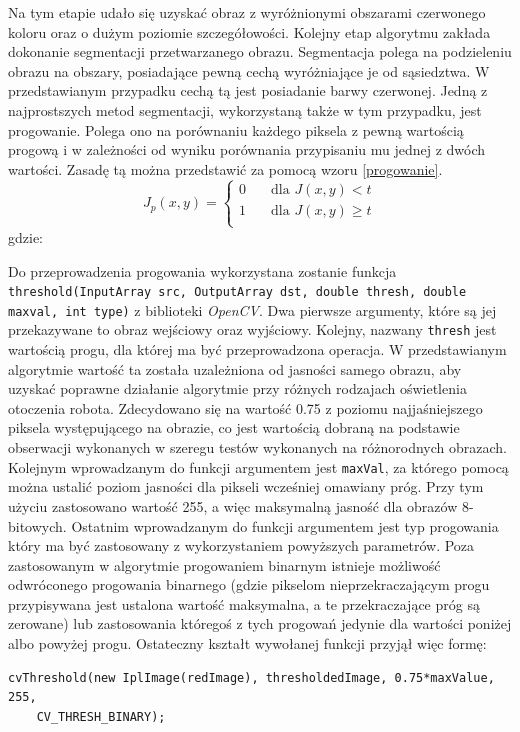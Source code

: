 Na tym etapie udało się uzyskać obraz z wyróżnionymi obszarami czerwonego koloru oraz o dużym poziomie szczegółowości. Kolejny etap algorytmu zakłada dokonanie segmentacji przetwarzanego obrazu. Segmentacja polega na podzieleniu obrazu na obszary, posiadające pewną cechą wyróżniające je od sąsiedztwa\cite{Malina}. W przedstawianym przypadku cechą tą jest posiadanie barwy czerwonej. Jedną z najprostszych metod segmentacji, wykorzystaną także w tym przypadku, jest progowanie. Polega ono na porównaniu każdego piksela z pewną wartością progową i w zależności od wyniku porównania przypisaniu mu jednej z dwóch wartości. Zasadę tą można przedstawić za pomocą wzoru \ref{progowanie}.
\begin{equation}
J_p(x, y) =
  \begin{cases}
    0	& \quad \text{dla } J(x, y) < t\\
    1	& \quad \text{dla } J(x, y) \geq t\\
  \end{cases}
\label{eq:progowanie}
\end{equation}
gdzie:
\begin{equationDescriptor}
\end{equationDescriptor}
Do przeprowadzenia progowania wykorzystana zostanie funkcja \texttt{threshold(InputArray src, OutputArray dst, double thresh, double maxval, int type)} z biblioteki \textit{OpenCV}. Dwa pierwsze argumenty, które są jej przekazywane to obraz wejściowy oraz wyjściowy. Kolejny, nazwany \texttt{thresh} jest wartością progu, dla której ma być przeprowadzona operacja. W przedstawianym algorytmie wartość ta została uzależniona od jasności samego obrazu, aby uzyskać poprawne działanie algorytmie przy różnych rodzajach oświetlenia otoczenia robota. Zdecydowano się na wartość 0.75 z poziomu najjaśniejszego piksela występującego na obrazie, co jest wartością dobraną na podstawie obserwacji wykonanych w szeregu testów wykonanych na różnorodnych obrazach. Kolejnym wprowadzanym do funkcji argumentem jest \texttt{maxVal}, za którego pomocą można ustalić poziom jasności dla pikseli wcześniej omawiany próg. Przy tym użyciu zastosowano wartość 255, a więc maksymalną jasność dla obrazów 8-bitowych. Ostatnim wprowadzanym do funkcji argumentem jest typ progowania który ma być zastosowany z wykorzystaniem powyższych parametrów. Poza zastosowanym w algorytmie progowaniem binarnym istnieje możliwość odwróconego progowania binarnego (gdzie pikselom nieprzekraczającym progu przypisywana jest ustalona wartość maksymalna, a te przekraczające próg są zerowane) lub zastosowania któregoś z tych progowań jedynie dla wartości poniżej albo powyżej progu. Ostateczny kształt wywołanej funkcji przyjął więc formę:
\begin{lstlisting}
cvThreshold(new IplImage(redImage), thresholdedImage, 0.75*maxValue, 255,
	CV_THRESH_BINARY);
\end{lstlisting}

